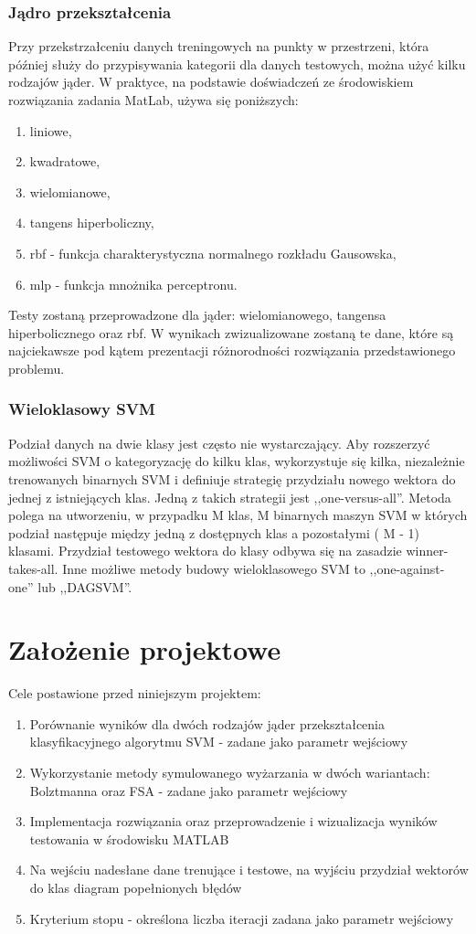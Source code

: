 \documentclass{article}
\begin{document}
\subsubsection{Jądro przekształcenia}
Przy przekstrzałceniu danych treningowych na punkty w przestrzeni, która później służy do przypisywania kategorii dla danych testowych, można użyć kilku rodzajów jąder. W praktyce, na podstawie doświadczeń ze środowiskiem rozwiązania zadania MatLab, używa się poniższych:
\begin{enumerate}
\item liniowe,
\item kwadratowe,
\item wielomianowe,
\item tangens hiperboliczny,
\item rbf - funkcja charakterystyczna normalnego rozkładu Gausowska,
\item mlp - funkcja mnożnika perceptronu.
\end{enumerate}
Testy zostaną przeprowadzone dla jąder: wielomianowego, tangensa hiperbolicznego oraz rbf. W wynikach zwizualizowane zostaną te dane, które są najciekawsze pod kątem prezentacji różnorodności rozwiązania przedstawionego problemu.
\subsubsection{Wieloklasowy SVM}
Podział danych na dwie klasy jest często nie wystarczający. Aby rozszerzyć możliwości SVM o kategoryzację do kilku klas, wykorzystuje się kilka, niezależnie trenowanych binarnych SVM i definiuje strategię przydziału nowego wektora do jednej z istniejących klas. Jedną z takich strategii jest ,,one-versus-all''. Metoda polega na utworzeniu, w przypadku M klas, M binarnych maszyn SVM w których podział następuje między jedną z dostępnych klas a pozostałymi ( M - 1) klasami. Przydział testowego wektora do klasy odbywa się na zasadzie winner-takes-all.
Inne możliwe metody budowy wieloklasowego SVM to ,,one-against-one'' lub ,,DAGSVM''.
 
\pagebreak
\section{Założenie projektowe}
Cele postawione przed niniejszym projektem:
\begin{enumerate}
\item Porównanie wyników dla dwóch rodzajów jąder przekształcenia klasyfikacyjnego algorytmu SVM - zadane jako parametr wejściowy
\item Wykorzystanie metody symulowanego wyżarzania w dwóch wariantach: Bolztmanna oraz FSA - zadane jako parametr wejściowy
\item Implementacja rozwiązania oraz przeprowadzenie i wizualizacja wyników testowania w środowisku MATLAB
\item Na wejściu nadesłane dane trenujące i testowe, na wyjściu przydział wektorów do klas diagram popełnionych błędów
\item Kryterium stopu - określona liczba iteracji zadana jako parametr wejściowy
\end{enumerate}
\end{document}
